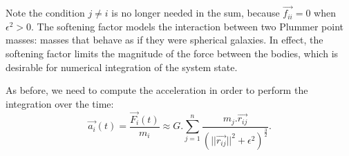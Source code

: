Note the condition $j\ne i$ is no longer needed in the sum, because $\vec{f_{ii}} = 0$ when $\epsilon ^2 > 0$.
The softening factor models the interaction between two Plummer point masses: masses that behave as if they were spherical galaxies.
In effect, the softening factor limits the magnitude of the force between the bodies, which is desirable for numerical integration of the system state.

As before, we need to compute the acceleration in order to perform the integration over the time:
\begin{equation}
\label{eq:accelerationSoft}
	\vec{a_i}(t) = \frac{\vec{F_i}(t)}{m_i} \approx G.\sum_{j = 1}^{n}\frac{m_j.\vec{r_{ij}}}{(||\vec{r_{ij}}||^2 + \epsilon^2)^\frac{3}{2}}.
\end{equation}